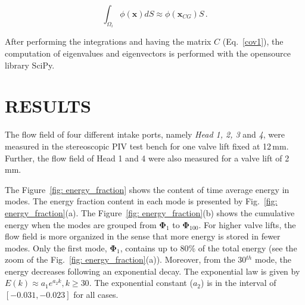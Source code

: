 \documentclass[12pt,a4paper]{article}
\newcommand{\bv}[1]{\mathbf{#1}}
\begin{document}
\begin{equation}
 \int_{\Omega_i} \phi (\bv{x}) dS \approx \phi (\bv{x}_{CG}) S \,.
\end{equation}

After performing the integrations and having the matrix $C$ (Eq.~\eqref{cov1}), the computation of eigenvalues and eigenvectors is performed with the opensource library SciPy.

\section{RESULTS}

The flow field of four different intake ports, namely \textit{Head 1, 2, 3} and \textit{4}, were measured in the stereoscopic PIV test bench for one valve lift fixed at 12\,mm.  Further, the flow field of Head 1 and 4 were also measured for a valve lift of 2\,mm.

The Figure~\ref{fig: energy_fraction} shows the content of time average energy in modes. The energy fraction content in each mode is presented by Fig.~\ref{fig: energy_fraction}(a). The Figure~\ref{fig: energy_fraction}(b) shows the cumulative energy when the modes are grouped from $\bv{\Phi}_1$ to $\bv{\Phi}_{100}$. For higher valve lifts, the flow field is more organized in the sense that more energy is stored in fewer modes. Only the first mode, $\bv{\Phi}_1$, contains up to 80$\%$ of the total energy (see the zoom of the Fig.~\ref{fig: energy_fraction}(a)). Moreover, from the 30$^{th}$ mode, the energy decreases following an exponential decay. The exponential law is given by $E(k) \approx a_1 e^{a_2 k} ,  k \ge 30$. The exponential constant ($a_2$) is in the interval of $[-0.031,-0.023]$ for all cases.
\end{document}
